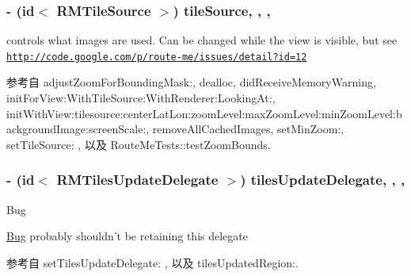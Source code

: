 \hypertarget{interface_r_m_map_contents_afdc2f45aee8bcc5633182450fdea0cfc}{
\subsubsection[{tile\-Source}]{\setlength{\rightskip}{0pt plus 5cm}-\/ (id$<$ {\bf R\-M\-Tile\-Source} $>$) tile\-Source\hspace{0.3cm}{\ttfamily [read]}, {\ttfamily [write]}, {\ttfamily [atomic]}, {\ttfamily [retain]}}}\label{interface_r_m_map_contents_afdc2f45aee8bcc5633182450fdea0cfc}


controls what images are used. Can be changed while the view is visible, but see \href{http://code.google.com/p/route-me/issues/detail?id=12}{\tt http\-://code.\-google.\-com/p/route-\/me/issues/detail?id=12} 



参考自 adjust\-Zoom\-For\-Bounding\-Mask\-:, dealloc, did\-Receive\-Memory\-Warning, init\-For\-View\-:\-With\-Tile\-Source\-:\-With\-Renderer\-:\-Looking\-At\-:, init\-With\-View\-:tilesource\-:center\-Lat\-Lon\-:zoom\-Level\-:max\-Zoom\-Level\-:min\-Zoom\-Level\-:background\-Image\-:screen\-Scale\-:, remove\-All\-Cached\-Images, set\-Min\-Zoom\-:, set\-Tile\-Source\-: , 以及 Route\-Me\-Tests\-::test\-Zoom\-Bounds.

\hypertarget{interface_r_m_map_contents_a37fd1037d5c01ab7543a46056039ec77}{
\subsubsection[{tiles\-Update\-Delegate}]{\setlength{\rightskip}{0pt plus 5cm}-\/ (id$<$ {\bf R\-M\-Tiles\-Update\-Delegate} $>$) tiles\-Update\-Delegate\hspace{0.3cm}{\ttfamily [read]}, {\ttfamily [write]}, {\ttfamily [nonatomic]}, {\ttfamily [retain]}}}\label{interface_r_m_map_contents_a37fd1037d5c01ab7543a46056039ec77}
\begin{DoxyRefDesc}{Bug}
\item[\hyperlink{bug__bug000012}{Bug}]probably shouldn't be retaining this delegate \end{DoxyRefDesc}


参考自 set\-Tiles\-Update\-Delegate\-: , 以及 tiles\-Updated\-Region\-:.

